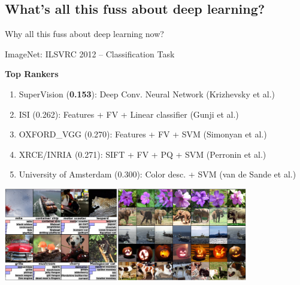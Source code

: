 \documentclass{beamer}
\begin{document}
\subsection{What's all this fuss about deep learning?}

\begin{frame}
    \centering 
    Why all this fuss about deep learning now?
\end{frame}

\begin{frame}{ImageNet: ILSVRC 2012 -- Classification Task}

    {\bf Top Rankers}
    {\small
    \begin{enumerate}
        \item SuperVision ({\bf 0.153}): Deep Conv. Neural Network
            {\scriptsize (Krizhevsky et al.)}
        \item ISI (0.262): Features + FV + Linear
            classifier {\scriptsize (Gunji et al.)}
        \item OXFORD\_VGG (0.270): Features + FV + SVM
            {\scriptsize (Simonyan et al.)}
        \item XRCE/INRIA (0.271): SIFT + FV + PQ + SVM
            {\scriptsize (Perronin et al.)}
        \item University of Amsterdam (0.300): Color desc. + SVM
            {\scriptsize (van de Sande et al.)}
    \end{enumerate}
    }

    \centering
    \includegraphics[width=0.8\textwidth]{krizhevsky.png}
    \\

\end{frame}
\end{document}
